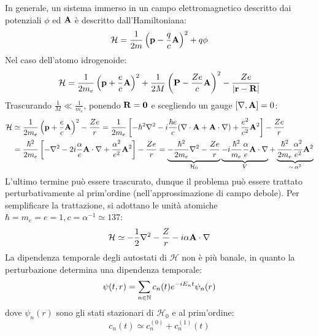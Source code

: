 In generale, un sistema immerso in un campo elettromagnetico descritto dai potenziali $ \phi $ ed $ \mathbf{A} $ è descritto dall'Hamiltoniana:
\begin{equation}
	\mathcal{H} = \frac{1}{2m} \left( \mathbf{p} - \frac{q}{c} \mathbf{A} \right)^2 + q \phi
\end{equation}
Nel caso dell'atomo idrogenoide:
\begin{equation}
	\mathcal{H} = \frac{1}{2m_e} \left( \mathbf{p} + \frac{e}{c} \mathbf{A} \right)^2 + \frac{1}{2M} \left( \mathbf{P} - \frac{Ze}{c} \mathbf{A} \right)^2 - \frac{Ze}{\left\lvert\mathbf{r} - \mathbf{R}\right\rvert}
\end{equation}
Trascurando $ \frac{1}{M} \ll \frac{1}{m_e} $, ponendo $ \mathbf{R} = \mathbf{0} $ e scegliendo un gauge $ [\nabla , \mathbf{A}] = 0 $:
\begin{equation*}
	\begin{split}
		\mathcal{H}
		& \simeq \frac{1}{2m_e} \left( \mathbf{p} + \frac{e}{c} \mathbf{A} \right)^2 - \frac{Ze}{r} = \frac{1}{2m_e} \left[ -\hbar^2 \nabla^2 - i \frac{\hbar e}{c} (\nabla \cdot \mathbf{A} + \mathbf{A} \cdot \nabla) + \frac{e^2}{c^2} \mathbf{A}^2 \right] - \frac{Ze}{r} \\
		& = \frac{\hbar^2}{2m_e} \left[ -\nabla^2 - 2i \frac{\alpha}{e} \mathbf{A} \cdot \nabla + \frac{\alpha^2}{e^2} \mathbf{A}^2 \right] - \frac{Ze}{r} = \underbrace{- \frac{\hbar^2}{2m_e} \nabla^2 - \frac{Ze}{r}}_{\mathcal{H}_0} \underbrace{- i \frac{\hbar^2}{m_e} \frac{\alpha}{e} \mathbf{A} \cdot \nabla}_{V} + \underbrace{\frac{\hbar^2}{2m_e} \frac{\alpha^2}{e^2} \mathbf{A}^2}_{\sim \, \alpha^2}
	\end{split}
\end{equation*}
L'ultimo termine può essere trascurato, dunque il problema può essere trattato perturbativamente al prim'ordine (nell'approssimazione di campo debole). Per semplificare la trattazione, si adottano le unità atomiche $ \hbar = m_e = e = 1 , c = \alpha^{-1} \simeq 137 $:
\begin{equation}
	\mathcal{H} \simeq - \frac{1}{2} \nabla^2 - \frac{Z}{r} - i \alpha \mathbf{A} \cdot \nabla
\end{equation}
La dipendenza temporale degli autostati di $ \mathcal{H} $ non è più banale, in quanto la perturbazione determina una dipendenza temporale:
\begin{equation}
	\psi(t,r) = \sum_{n \in \mathbb{N}} c_n(t) e^{-i E_n t} \psi_n(r)
	\label{eq:1-e-pert-autof}
\end{equation}
dove $ \psi_n(r) $ sono gli stati stazionari di $ \mathcal{H}_0 $ e al prim'ordine:
\begin{equation}
	c_n(t) \simeq c_n^{(0)} + c_n^{(1)}(t)
	\label{eq:1-e-pert-coeff}
\end{equation}

